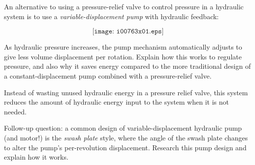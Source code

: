 

An alternative to using a pressure-relief valve to control pressure in a hydraulic system is to use a {\it variable-displacement pump} with hydraulic feedback:

$$\texttt{[image: i00763x01.eps]}$$

As hydraulic pressure increases, the pump mechanism automatically adjusts to give less volume displacement per rotation.  Explain how this works to regulate pressure, and also why it saves energy compared to the more traditional design of a constant-displacement pump combined with a pressure-relief valve.







Instead of wasting unused hydraulic energy in a pressure relief valve, this system reduces the amount of hydraulic energy input to the system when it is not needed.

\vskip 10pt

Follow-up question: a common design of variable-displacement hydraulic pump (and motor!) is the {\it swash plate} style, where the angle of the swash plate changes to alter the pump's per-revolution displacement.  Research this pump design and explain how it works.










